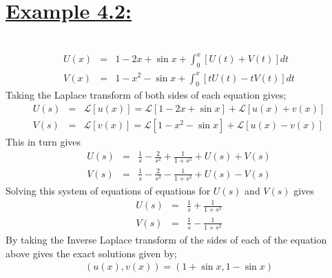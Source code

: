 \documentclass[11pt]{report}
\newcommand{\ubt}[1]{\textbf{\underline{#1}}}
\newcommand{\sps}{\\[0.2cm]}
\newcommand{\spn}[1]{\\[#1cm]}
\newcommand{\example}[1]{\section*{\ubt{Example #1:}}{~}\spn{-1.7}}
\begin{document}
	\example{4.2}
	\begin{eqnarray*}
		U(x) &=& 1 - 2x + \sin x + \int_{0}^{x} [U(t) + V(t)]dt\sps
		V(x) &=& 1 - x^2 - \sin x + \int_{0}^{x} [tU(t) - tV(t)]dt
	\end{eqnarray*}
	Taking the Laplace transform of both sides of each equation gives;
	\begin{eqnarray*}
		U(s) &=& \mathcal{L}[u(x)] = \mathcal{L}[1 - 2x + \sin x] + \mathcal{L}[u(x) + v(x)]\sps
		V(s) &=& \mathcal{L}[v(x)] = \mathcal{L}[1 - x^2 - \sin x] + \mathcal{L}[u(x) - v(x)]
	\end{eqnarray*}	
	This in turn gives
	\begin{eqnarray*}
		U(s) &=& \frac{1}{s} - \frac{2}{s^2} + \frac{1}{1 + s^2} + U(s) + V(s)\sps
		V(s) &=& \frac{1}{s} - \frac{2}{s^3} - \frac{1}{1 + s^2} + U(s) - V(s)
	\end{eqnarray*}
	Solving this system of equations of equations for $U(s)$ and $V(s)$ gives
	\begin{eqnarray*}
		U(s) &=& \frac{1}{s} + \frac{1}{1 + s^2}\sps
		V(s) &=& \frac{1}{s} - \frac{1}{1 + s^2}
	\end{eqnarray*}
	By taking the Inverse Laplace transform of the sides of each of the equation above gives the exact solutions given by;
	\begin{eqnarray*}
		(u(x), v(x)) =(1 + \sin x, 1 - \sin x)
	\end{eqnarray*}
	
\end{document}
